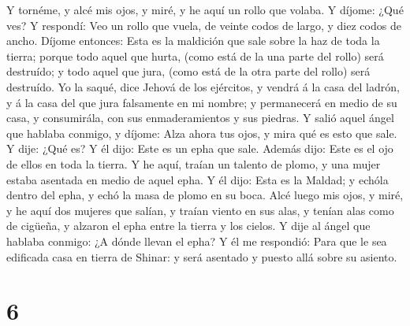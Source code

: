  Y tornéme, y alcé mis ojos, y miré, y he aquí un rollo que
volaba.  Y díjome: ¿Qué ves? Y respondí: Veo un rollo que
vuela, de veinte codos de largo, y diez codos de ancho. 
Díjome entonces: Esta es la maldición que sale sobre la haz de toda la
tierra; porque todo aquel que hurta, (como está de la una parte del
rollo) será destruído; y todo aquel que jura, (como está de la otra
parte del rollo) será destruído.  Yo la saqué, dice Jehová
de los ejércitos, y vendrá á la casa del ladrón, y á la casa del que
jura falsamente en mi nombre; y permanecerá en medio de su casa, y
consumirála, con sus enmaderamientos y sus piedras.  Y salió
aquel ángel que hablaba conmigo, y díjome: Alza ahora tus ojos, y mira
qué es esto que sale.  Y dije: ¿Qué es? Y él dijo: Este es
un epha que sale. Además dijo: Este es el ojo de ellos en toda la
tierra.  Y he aquí, traían un talento de plomo, y una mujer
estaba asentada en medio de aquel epha.  Y él dijo: Esta es
la Maldad; y echóla dentro del epha, y echó la masa de plomo en su boca.
 Alcé luego mis ojos, y miré, y he aquí dos mujeres que
salían, y traían viento en sus alas, y tenían alas como de cigüeña, y
alzaron el epha entre la tierra y los cielos.  Y dije al
ángel que hablaba conmigo: ¿A dónde llevan el epha?  Y él
me respondió: Para que le sea edificada casa en tierra de Shinar: y será
asentado y puesto allá sobre su asiento.

\hypertarget{section-5}{%
\section{6}\label{section-5}}

